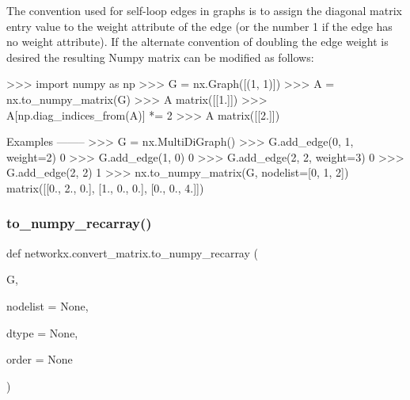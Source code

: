 \begin{DoxyVerb}
The convention used for self-loop edges in graphs is to assign the
diagonal matrix entry value to the weight attribute of the edge
(or the number 1 if the edge has no weight attribute).  If the
alternate convention of doubling the edge weight is desired the
resulting Numpy matrix can be modified as follows:

>>> import numpy as np
>>> G = nx.Graph([(1, 1)])
>>> A = nx.to_numpy_matrix(G)
>>> A
matrix([[1.]])
>>> A[np.diag_indices_from(A)] *= 2
>>> A
matrix([[2.]])

Examples
--------
>>> G = nx.MultiDiGraph()
>>> G.add_edge(0, 1, weight=2)
0
>>> G.add_edge(1, 0)
0
>>> G.add_edge(2, 2, weight=3)
0
>>> G.add_edge(2, 2)
1
>>> nx.to_numpy_matrix(G, nodelist=[0, 1, 2])
matrix([[0., 2., 0.],
        [1., 0., 0.],
        [0., 0., 4.]])\end{DoxyVerb}
 \mbox{\label{namespacenetworkx_1_1convert__matrix_ad41194dd5380831f9c70606b71bb3b07}} 
\subsubsection{\texorpdfstring{to\+\_\+numpy\+\_\+recarray()}{to\_numpy\_recarray()}}
{\footnotesize\ttfamily def networkx.\+convert\+\_\+matrix.\+to\+\_\+numpy\+\_\+recarray (\begin{DoxyParamCaption}\item[{}]{G,  }\item[{}]{nodelist = {\ttfamily None},  }\item[{}]{dtype = {\ttfamily None},  }\item[{}]{order = {\ttfamily None} }\end{DoxyParamCaption})}

